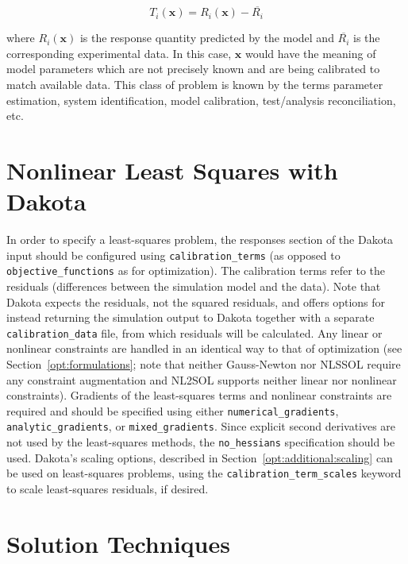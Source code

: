 \begin{equation}
  T_i(\mathbf{x}) = R_i(\mathbf{x})-\overline{R_i}
  \label{nls:equation03}
\end{equation}

where $R_i(\mathbf{x})$ is the response quantity predicted by the
model and $\overline{R_i}$ is the corresponding experimental data.
In this case, $\mathbf{x}$ would have the meaning of model parameters
which are not precisely known and are being calibrated to match
available data. This class of problem is known by the terms parameter
estimation, system identification, model calibration, test/analysis
reconciliation, etc.

\section{Nonlinear Least Squares with Dakota}

In order to specify a least-squares problem, the responses section of
the Dakota input should be configured using
\texttt{calibration\_terms} (as opposed to
\texttt{objective\_functions} as for optimization). The
calibration terms refer to the residuals (differences between the
simulation model and the data). Note that Dakota expects the
residuals, not the squared residuals, and offers options for instead
returning the simulation output to Dakota together with a separate
\texttt{calibration\_data} file, from which residuals will be
calculated. Any
linear or nonlinear constraints are handled in an identical way to
that of optimization (see Section~\ref{opt:formulations}; note that
neither Gauss-Newton nor NLSSOL require any constraint augmentation
and NL2SOL supports neither linear nor nonlinear constraints).
Gradients of the least-squares terms and nonlinear constraints are
required and should be specified using either
\texttt{numerical\_gradients}, \texttt{analytic\_gradients}, or
\texttt{mixed\_gradients}. Since explicit second derivatives are not
used by the least-squares methods, the \texttt{no\_hessians}
specification should be used. Dakota's scaling options, described in
Section~\ref{opt:additional:scaling} can be used on least-squares
problems, using the \texttt{calibration\_term\_scales} keyword to
scale least-squares residuals, if desired.

\section{Solution Techniques}\label{nls:solution}

